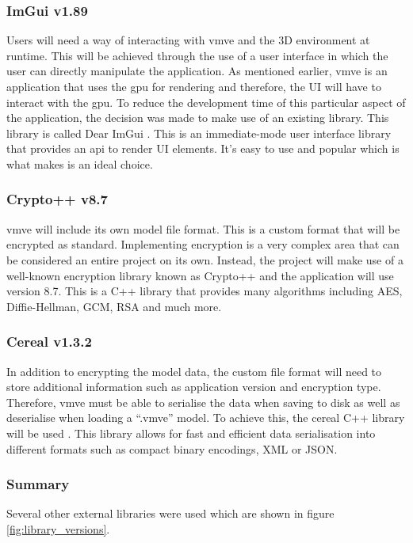 \documentclass[11pt]{article}
\begin{document}
\subsubsection{ImGui v1.89}
Users will need a way of interacting with \gls*{vmve} and the 3D environment at
runtime. This will be achieved through the use of a user interface in which the
user can directly manipulate the application. As mentioned earlier, \gls*{vmve}
is an application that uses the \gls*{gpu} for rendering and therefore, the UI
will have to interact with the \gls*{gpu}. To reduce the development time of
this particular aspect of the application, the decision was made to make use of
an existing library. This library is called Dear ImGui \cite{imgui}. This is an
immediate-mode user interface library that provides an \gls*{api} to render UI
elements. It's easy to use and popular which is what makes is an ideal choice.

\subsubsection{Crypto++ v8.7} \label{custom_file_format}
\gls*{vmve} will include its own model file format. This is a custom format that
will be encrypted as standard. Implementing encryption is a very complex area
that can be considered an entire project on its own. Instead, the project will
make use of a well-known encryption library known as Crypto++ \cite{cryptopp}
and the application will use version 8.7. This is a C++ library that provides
many algorithms including AES, Diffie-Hellman, GCM, RSA and much more.

\subsubsection{Cereal v1.3.2}
In addition to encrypting the model data, the custom file format will need to
store additional information such as application version and encryption type.
Therefore, \gls*{vmve} must be able to serialise the data when saving to disk as
well as deserialise when loading a ``.vmve'' model. To achieve this, the cereal
C++ library will be used \cite{cereal}. This library allows for fast and
efficient data serialisation into different formats such as compact binary
encodings, XML or JSON.

\subsubsection{Summary}
Several other external libraries were used which are shown in figure
\ref{fig:library_versions}. 
\end{document}
